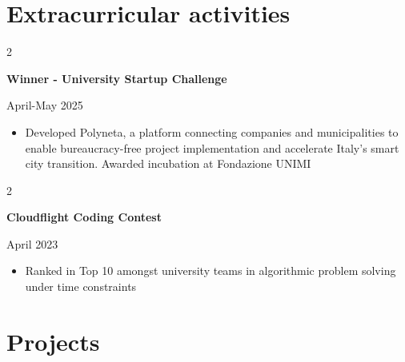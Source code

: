 \documentclass[10pt, letterpaper]{article}
\newenvironment{highlights}{
    \begin{itemize}[
        topsep=0.10 cm,
        parsep=0.10 cm,
        partopsep=0pt,
        itemsep=0pt,
        leftmargin=0 cm + 10pt
    ]
}{
    \end{itemize}
} %
\newenvironment{twocolentry}[2][]{
    \onecolentry
    \def\secondColumn{#2}
    \setcolumnwidth{\fill, 4.5 cm}
    \begin{paracol}{2}
}{
    \switchcolumn \raggedleft \secondColumn
    \end{paracol}
    \endonecolentry
} %
\begin{document}

    \section{Extracurricular activities}
        
        \begin{samepage}
            \begin{twocolentry}{
               April-May 2025
            }
                \textbf{Winner - University Startup Challenge}
            \end{twocolentry}
            \begin{highlights}
              \item Developed Polyneta, a platform connecting companies and municipalities to enable bureaucracy-free project implementation and accelerate Italy’s smart city transition. Awarded incubation at Fondazione UNIMI
            \end{highlights}

            \vspace{0.10 cm}

            \begin{twocolentry}{
               April 2023
            }
                \textbf{Cloudflight Coding Contest}
            \end{twocolentry}
            \begin{highlights}
              \item Ranked in Top 10 amongst university teams in algorithmic problem solving under time constraints
            \end{highlights}
            
        \end{samepage}
    
    \section{Projects}
\end{document}
